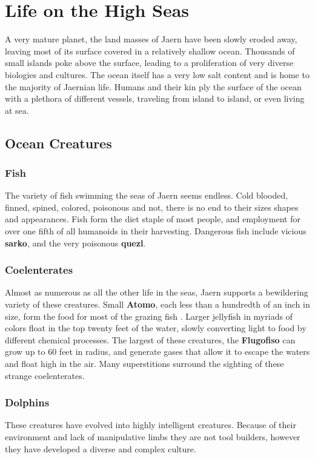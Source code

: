 \chapter{Life on the High Seas}
\label{ch:high-seas}
A very mature planet, the land masses of Jaern have been slowly eroded away, leaving most of its surface covered in a relatively shallow ocean. Thousands of small islands
poke above the surface, leading to a proliferation of very diverse biologies and cultures. The ocean itself has a very low salt content and is home to the majority of Jaernian life. Humans and their kin ply the surface of the ocean with a plethora of different vessels, traveling from island to island, or even living at sea.
\setlength{\columnsep}{\defcolwidth}
\begin{multicols*}{2}
\section{Ocean Creatures}
\subsection{Fish}
The variety of fish swimming the seas of Jaern
seems endless. Cold blooded, finned, spined, colored, poisonous and not, there is no end to their sizes shapes and appearances. Fish form the diet staple of most people, and
employment for over one fifth of all humanoids in their harvesting. Dangerous fish include vicious \textbf{sarko}, and the very poisonous \textbf{quezl}.
\subsection{Coelenterates}
Almost as numerous as all the other life in the seas, Jaern supports a bewildering variety of these creatures. Small \textbf{Atomo}, each less than a hundredth of an inch in size, form the food for most of the grazing fish . Larger jellyfish in myriads of colors float in the top twenty feet of the water,
slowly converting light to food by different chemical  processes. The largest of these creatures, the \textbf{Flugofiso} can grow up to 60 feet in radius, and generate gases that allow it
to escape the waters and float high in the air. Many superstitions surround the sighting of these strange coelenterates. 
\subsection{Dolphins}
These creatures have evolved into highly intelligent creatures. Because of their environment and lack of manipulative limbs they are not tool builders, however they have developed a diverse and complex culture.


\end{multicols*}
